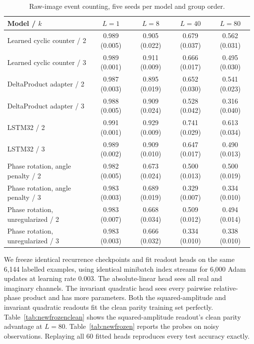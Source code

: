 \begin{table}[tbp]
\centering\small
\caption{Raw-image event counting, five seeds per model and group order.}
\label{tab:newvision}
\setlength{\tabcolsep}{3pt}
\begin{tabular}{lcccc}
\toprule
Model / $k$ & $L=1$ & $L=8$ & $L=40$ & $L=80$ \\
\midrule
Learned cyclic counter / 2 & 0.989 (0.005) & 0.905 (0.022) & 0.679 (0.037) & 0.562 (0.031) \\
Learned cyclic counter / 3 & 0.989 (0.001) & 0.911 (0.009) & 0.666 (0.017) & 0.495 (0.030) \\
DeltaProduct adapter / 2 & 0.987 (0.003) & 0.895 (0.019) & 0.652 (0.030) & 0.541 (0.023) \\
DeltaProduct adapter / 3 & 0.988 (0.005) & 0.909 (0.024) & 0.528 (0.042) & 0.316 (0.040) \\
LSTM32 / 2 & 0.991 (0.001) & 0.929 (0.009) & 0.741 (0.029) & 0.613 (0.034) \\
LSTM32 / 3 & 0.989 (0.002) & 0.909 (0.010) & 0.647 (0.017) & 0.490 (0.013) \\
Phase rotation, angle penalty / 2 & 0.982 (0.005) & 0.673 (0.024) & 0.500 (0.013) & 0.500 (0.019) \\
Phase rotation, angle penalty / 3 & 0.983 (0.003) & 0.689 (0.019) & 0.329 (0.007) & 0.334 (0.010) \\
Phase rotation, unregularized / 2 & 0.983 (0.007) & 0.668 (0.034) & 0.509 (0.012) & 0.494 (0.014) \\
Phase rotation, unregularized / 3 & 0.983 (0.003) & 0.666 (0.032) & 0.334 (0.010) & 0.338 (0.010) \\
\bottomrule
\end{tabular}
\end{table}

We freeze identical recurrence checkpoints and fit readout heads on the same
6,144 labelled examples, using identical minibatch index streams for 6,000 Adam
updates at learning rate $0.003$.
The absolute-linear head sees all real and imaginary channels. The invariant
quadratic head sees every pairwise relative-phase product and has more parameters.
Both the squared-amplitude and invariant quadratic readouts fit the clean
parity training set perfectly. Table~\ref{tab:newfrozenclean} shows the
squared-amplitude readout's clean parity advantage at $L=80$.
Table~\ref{tab:newfrozen} reports the probes on noisy observations.
Replaying all 60 fitted heads reproduces every test accuracy exactly.

